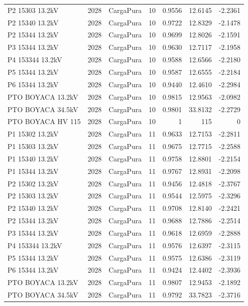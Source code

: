 \documentclass[11pt,a4paper]{article}
\begin{document}
\begin{longtable}{llllrrr}
P2 15303 13.2kV & 2028 & CargaPura & 10 & 0.9556 & 12.6145 & -2.2361 \\
P2 15340 13.2kV & 2028 & CargaPura & 10 & 0.9722 & 12.8329 & -2.1478 \\
P2 15344 13.2kV & 2028 & CargaPura & 10 & 0.9699 & 12.8026 & -2.1591 \\
P3 15344 13.2kV & 2028 & CargaPura & 10 & 0.9630 & 12.7117 & -2.1958 \\
P4 153344 13.2kV & 2028 & CargaPura & 10 & 0.9588 & 12.6566 & -2.2180 \\
P5 15344 13.2kV & 2028 & CargaPura & 10 & 0.9587 & 12.6555 & -2.2184 \\
P6 15344 13.2kV & 2028 & CargaPura & 10 & 0.9440 & 12.4610 & -2.2984 \\
PTO BOYACA 13.2kV & 2028 & CargaPura & 10 & 0.9815 & 12.9563 & -2.0982 \\
PTO BOYACA 34.5kV & 2028 & CargaPura & 10 & 0.9801 & 33.8132 & -2.2729 \\
PTO BOYACA HV 115 & 2028 & CargaPura & 10 & 1 & 115 & 0 \\
P1 15302 13.2kV & 2028 & CargaPura & 11 & 0.9633 & 12.7153 & -2.2811 \\
P1 15303 13.2kV & 2028 & CargaPura & 11 & 0.9675 & 12.7715 & -2.2588 \\
P1 15340 13.2kV & 2028 & CargaPura & 11 & 0.9758 & 12.8801 & -2.2154 \\
P1 15344 13.2kV & 2028 & CargaPura & 11 & 0.9767 & 12.8931 & -2.2098 \\
P2 15302 13.2kV & 2028 & CargaPura & 11 & 0.9456 & 12.4818 & -2.3767 \\
P2 15303 13.2kV & 2028 & CargaPura & 11 & 0.9544 & 12.5975 & -2.3296 \\
P2 15340 13.2kV & 2028 & CargaPura & 11 & 0.9708 & 12.8140 & -2.2421 \\
P2 15344 13.2kV & 2028 & CargaPura & 11 & 0.9688 & 12.7886 & -2.2514 \\
P3 15344 13.2kV & 2028 & CargaPura & 11 & 0.9618 & 12.6959 & -2.2888 \\
P4 153344 13.2kV & 2028 & CargaPura & 11 & 0.9576 & 12.6397 & -2.3115 \\
P5 15344 13.2kV & 2028 & CargaPura & 11 & 0.9575 & 12.6386 & -2.3119 \\
P6 15344 13.2kV & 2028 & CargaPura & 11 & 0.9424 & 12.4402 & -2.3936 \\
PTO BOYACA 13.2kV & 2028 & CargaPura & 11 & 0.9807 & 12.9453 & -2.1892 \\
PTO BOYACA 34.5kV & 2028 & CargaPura & 11 & 0.9792 & 33.7823 & -2.3716 \\

\end{longtable}
\end{document}
